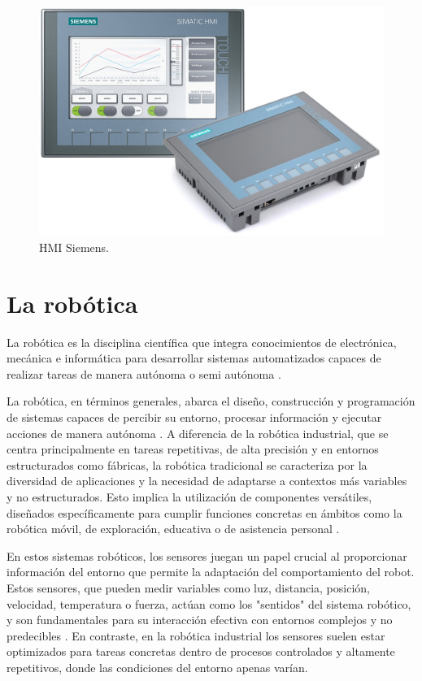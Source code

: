 \begin{figure} [h!]
  \begin{center}
    \includegraphics[width=13cm]{figs/HMI}
  \end{center}
  \caption{\centering HMI Siemens.}
  \label{fig:HMI}
\end{figure} 

\section{La robótica}
\label{sec:segundaseccion} %

La robótica es la disciplina científica que integra conocimientos de electrónica, mecánica e informática para desarrollar sistemas automatizados capaces de realizar tareas de manera autónoma o semi autónoma \cite{definicion_robot}. 

La robótica, en términos generales, abarca el diseño, construcción y programación de sistemas capaces de percibir su entorno, procesar información y ejecutar acciones de manera autónoma \cite{definicion_robot_2}. A diferencia de la robótica industrial, que se centra principalmente en tareas repetitivas, de alta precisión y en entornos estructurados como fábricas, la robótica tradicional se caracteriza por la diversidad de aplicaciones y la necesidad de adaptarse a contextos más variables y no estructurados. Esto implica la utilización de componentes versátiles, diseñados específicamente para cumplir funciones concretas en ámbitos como la robótica móvil, de exploración, educativa o de asistencia personal \cite{definicion_robot_2}.

En estos sistemas robóticos, los sensores juegan un papel crucial al proporcionar información del entorno que permite la adaptación del comportamiento del robot. Estos sensores, que pueden medir variables como luz, distancia, posición, velocidad, temperatura o fuerza, actúan como los "sentidos" del sistema robótico, y son fundamentales para su interacción efectiva con entornos complejos y no predecibles \cite{definicion_robot_2}. En contraste, en la robótica industrial los sensores suelen estar optimizados para tareas concretas dentro de procesos controlados y altamente repetitivos, donde las condiciones del entorno apenas varían.

